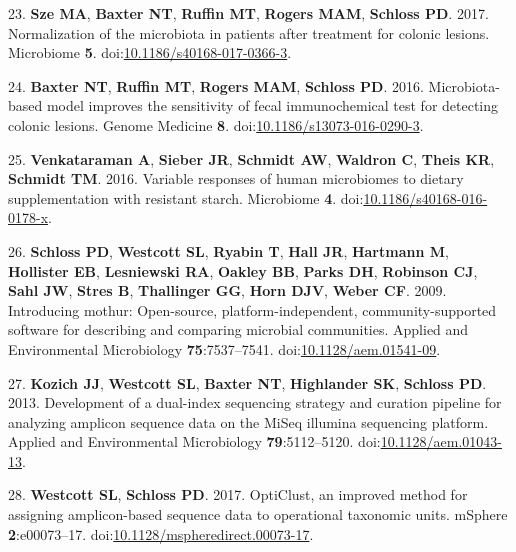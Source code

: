\documentclass[11pt,]{article}
\begin{document}
\hypertarget{ref-normalization_sze2017}{}
23. \textbf{Sze MA}, \textbf{Baxter NT}, \textbf{Ruffin MT},
\textbf{Rogers MAM}, \textbf{Schloss PD}. 2017. Normalization of the
microbiota in patients after treatment for colonic lesions. Microbiome
\textbf{5}.
doi:\href{https://doi.org/10.1186/s40168-017-0366-3}{10.1186/s40168-017-0366-3}.

\hypertarget{ref-crc_model_baxter2016}{}
24. \textbf{Baxter NT}, \textbf{Ruffin MT}, \textbf{Rogers MAM},
\textbf{Schloss PD}. 2016. Microbiota-based model improves the
sensitivity of fecal immunochemical test for detecting colonic lesions.
Genome Medicine \textbf{8}.
doi:\href{https://doi.org/10.1186/s13073-016-0290-3}{10.1186/s13073-016-0290-3}.

\hypertarget{ref-scfa_measures_venkataraman2016}{}
25. \textbf{Venkataraman A}, \textbf{Sieber JR}, \textbf{Schmidt AW},
\textbf{Waldron C}, \textbf{Theis KR}, \textbf{Schmidt TM}. 2016.
Variable responses of human microbiomes to dietary supplementation with
resistant starch. Microbiome \textbf{4}.
doi:\href{https://doi.org/10.1186/s40168-016-0178-x}{10.1186/s40168-016-0178-x}.

\hypertarget{ref-Schloss2009}{}
26. \textbf{Schloss PD}, \textbf{Westcott SL}, \textbf{Ryabin T},
\textbf{Hall JR}, \textbf{Hartmann M}, \textbf{Hollister EB},
\textbf{Lesniewski RA}, \textbf{Oakley BB}, \textbf{Parks DH},
\textbf{Robinson CJ}, \textbf{Sahl JW}, \textbf{Stres B},
\textbf{Thallinger GG}, \textbf{Horn DJV}, \textbf{Weber CF}. 2009.
Introducing mothur: Open-source, platform-independent,
community-supported software for describing and comparing microbial
communities. Applied and Environmental Microbiology
\textbf{75}:7537--7541.
doi:\href{https://doi.org/10.1128/aem.01541-09}{10.1128/aem.01541-09}.

\hypertarget{ref-Kozich2013}{}
27. \textbf{Kozich JJ}, \textbf{Westcott SL}, \textbf{Baxter NT},
\textbf{Highlander SK}, \textbf{Schloss PD}. 2013. Development of a
dual-index sequencing strategy and curation pipeline for analyzing
amplicon sequence data on the MiSeq illumina sequencing platform.
Applied and Environmental Microbiology \textbf{79}:5112--5120.
doi:\href{https://doi.org/10.1128/aem.01043-13}{10.1128/aem.01043-13}.

\hypertarget{ref-opticlust_westcott2017}{}
28. \textbf{Westcott SL}, \textbf{Schloss PD}. 2017. OptiClust, an
improved method for assigning amplicon-based sequence data to
operational taxonomic units. mSphere \textbf{2}:e00073--17.
doi:\href{https://doi.org/10.1128/mspheredirect.00073-17}{10.1128/mspheredirect.00073-17}.
\end{document}
